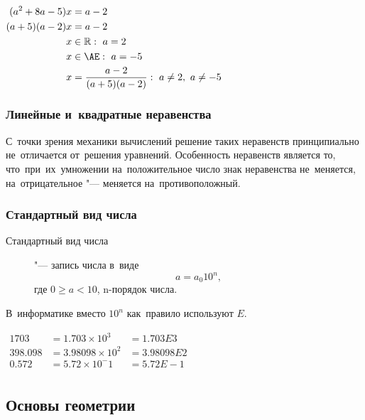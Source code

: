 \documentclass[]{scrartcl}
\begin{document}
\begin{Thexmpl}\label{ex:tasks-with-parametres-2}
	$\begin{aligned}
		(a^2+8a-5)x&=a-2\\
		(a+5)(a-2)x&=a-2\\
		x &\in \mathbb{R}:\ a=2\\
		x &\in \AE:\ a=-5\\
		x&=\frac{a-2}{(a+5)(a-2)}:\ a\neq 2,\ a\neq-5\\
	\end{aligned}$
\end{Thexmpl}
\subsubsection{Линейные и~квадратные неравенства}
С~точки зрения механики вычислений решение таких неравенств принципиально не~отличается от~решения уравнений. Особенность неравенств является то, что~при~их~умножении на~положительное число знак неравенства не~меняется, на~отрицательное "--- меняется на~противоположный.
\subsubsection{Стандартный вид числа}
\begin{description}
	\item[Стандартный вид числа] "--- запись числа в~виде
	\begin{equation}\label{eq:stand-numer}
	a=a_{0}10^{n},
	\end{equation}
где $0 \geq a < 10$, n-порядок числа.
\end{description}
В~информатике вместо $10^n$ как~правило используют $E$.
\begin{Thexmpl}\label{ex:stand}
	$\begin{aligned}
	1703 &= 1.703 \times 10^3 &= 1.703E3\\
	398.098 &= 3.98098 \times 10^2 &=3.98098E2\\
	0.572 &=5.72 \times 10^-1 &=5.72E-1\\
	\end{aligned}$
\end{Thexmpl}
 
\subsection{Основы геометрии}
\end{document}
